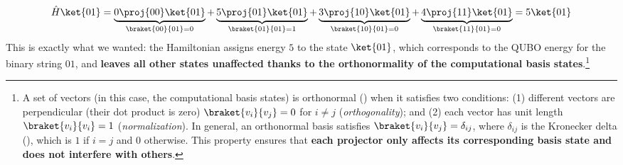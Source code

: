 \begin{equation*}
    \hat{H}\ket{01} = \underbrace{0 \proj{00}\ket{01}}_{\braket{00}{01} = 0} + \underbrace{5 \proj{01}\ket{01}}_{\braket{01}{01} = 1} + \underbrace{3 \proj{10}\ket{01}}_{\braket{10}{01} = 0} + \underbrace{4 \proj{11}\ket{01}}_{\braket{11}{01} = 0} = 5 \ket{01}
\end{equation*}
This is exactly what we wanted: the Hamiltonian assigns energy $5$ to the state $\ket{01}$, which corresponds to the QUBO energy for the binary string $01$, and \textbf{leaves all other states unaffected thanks to the orthonormality of the computational basis states}.\footnote{
    A set of vectors (in this case, the computational basis states) is orthonormal () when it satisfies two conditions: (1) different vectors are perpendicular (their dot product is zero) $\braket{v_i}{v_j} = 0$ for $i \neq j$ (\emph{orthogonality}); and (2) each vector has unit length $\braket{v_i}{v_i} = 1$ (\emph{normalization}). In general, an orthonormal basis satisfies $\braket{v_i}{v_j} = \delta_{ij}$, where $\delta_{ij}$ is the Kronecker delta (), which is $1$ if $i = j$ and $0$ otherwise. This property ensures that \textbf{each projector only affects its corresponding basis state and does not interfere with others}.
}

